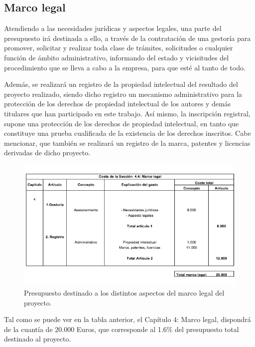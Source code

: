 \documentclass[12pt,oneside,a4paper]{article}
\numberwithin{figure}{section}
\begin{document}
\subsection{Marco legal}

Atendiendo a las necesidades jurídicas y aspectos legales, una parte del presupuesto irá destinada a ello, a través de la contratación de una gestoría para promover, solicitar y realizar toda clase de trámites, solicitudes o cualquier función de ámbito administrativo, informando del estado y vicisitudes del procedimiento que se lleva a cabo a la empresa, para que esté al tanto de todo.

Además, se realizará un registro de la propiedad intelectual del resultado del proyecto realizado, siendo dicho registro un mecanismo administrativo para la protección de los derechos de propiedad intelectual de los autores y demás titulares que han participado en este trabajo. Así mismo, la inscripción registral, supone una protección de los derechos de propiedad intelectual, en tanto que constituye una prueba cualificada de la existencia de los derechos inscritos. Cabe mencionar, que también se realizará un registro de la marca, patentes y licencias derivadas de dicho proyecto.

\begin{figure}[H]
\begin{center}
\includegraphics[scale=.8]{Legal.png}
\caption{Presupuesto destinado a los distintos aspectos del marco legal del proyecto.}
\end{center}
\end{figure}

Tal como se puede ver en la tabla anterior, el Capítulo 4: Marco legal, dispondrá de la cuantía de 20.000 Euros, que corresponde al 1.6$\%$ del presupuesto total destinado al proyecto.
\end{document}
